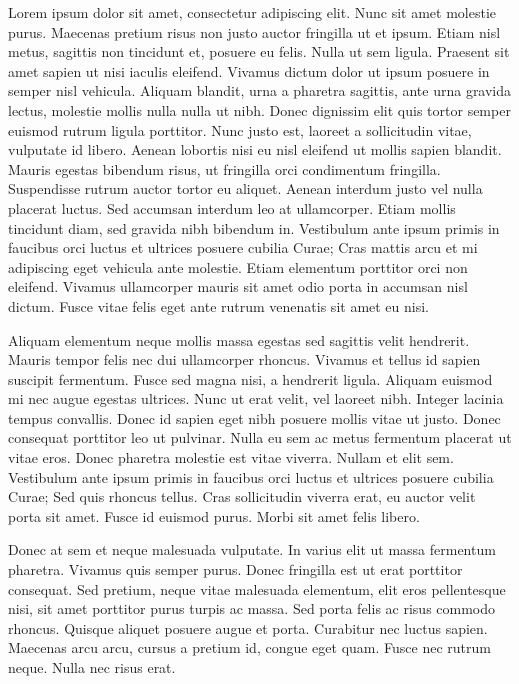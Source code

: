 Lorem ipsum dolor sit amet, consectetur adipiscing elit. Nunc sit amet molestie purus. Maecenas pretium risus non justo auctor fringilla ut et ipsum. Etiam nisl metus, sagittis non tincidunt et, posuere eu felis. Nulla ut sem ligula. Praesent sit amet sapien ut nisi iaculis eleifend. Vivamus dictum dolor ut ipsum posuere in semper nisl vehicula. Aliquam blandit, urna a pharetra sagittis, ante urna gravida lectus, molestie mollis nulla nulla ut nibh. Donec dignissim elit quis tortor semper euismod rutrum ligula porttitor. Nunc justo est, laoreet a sollicitudin vitae, vulputate id libero. Aenean lobortis nisi eu nisl eleifend ut mollis sapien blandit. Mauris egestas bibendum risus, ut fringilla orci condimentum fringilla. Suspendisse rutrum auctor tortor eu aliquet. Aenean interdum justo vel nulla placerat luctus. Sed accumsan interdum leo at ullamcorper. Etiam mollis tincidunt diam, sed gravida nibh bibendum in. Vestibulum ante ipsum primis in faucibus orci luctus et ultrices posuere cubilia Curae; Cras mattis arcu et mi adipiscing eget vehicula ante molestie. Etiam elementum porttitor orci non eleifend. Vivamus ullamcorper mauris sit amet odio porta in accumsan nisl dictum. Fusce vitae felis eget ante rutrum venenatis sit amet eu nisi.

Aliquam elementum neque mollis massa egestas sed sagittis velit hendrerit. Mauris tempor felis nec dui ullamcorper rhoncus. Vivamus et tellus id sapien suscipit fermentum. Fusce sed magna nisi, a hendrerit ligula. Aliquam euismod mi nec augue egestas ultrices. Nunc ut erat velit, vel laoreet nibh. Integer lacinia tempus convallis. Donec id sapien eget nibh posuere mollis vitae ut justo. Donec consequat porttitor leo ut pulvinar. Nulla eu sem ac metus fermentum placerat ut vitae eros. Donec pharetra molestie est vitae viverra. Nullam et elit sem. Vestibulum ante ipsum primis in faucibus orci luctus et ultrices posuere cubilia Curae; Sed quis rhoncus tellus. Cras sollicitudin viverra erat, eu auctor velit porta sit amet. Fusce id euismod purus. Morbi sit amet felis libero.

Donec at sem et neque malesuada vulputate. In varius elit ut massa fermentum pharetra. Vivamus quis semper purus. Donec fringilla est ut erat porttitor consequat. Sed pretium, neque vitae malesuada elementum, elit eros pellentesque nisi, sit amet porttitor purus turpis ac massa. Sed porta felis ac risus commodo rhoncus. Quisque aliquet posuere augue et porta. Curabitur nec luctus sapien. Maecenas arcu arcu, cursus a pretium id, congue eget quam. Fusce nec rutrum neque. Nulla nec risus erat.

